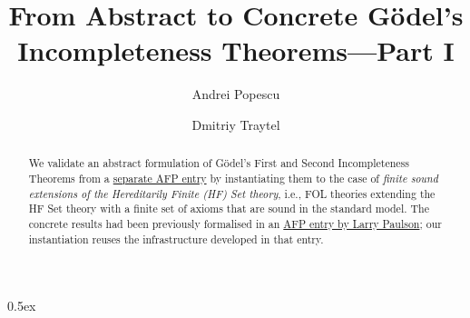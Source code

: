 \documentclass[10pt,a4paper]{article}
\begin{document}
\title{From Abstract to Concrete G\"odel's Incompleteness Theorems---Part I}
\author{Andrei Popescu \and Dmitriy Traytel}

\maketitle

\begin{abstract} We validate an abstract formulation of G\"odel's First and Second Incompleteness Theorems
from a \href{https://www.isa-afp.org/entries/Goedel_Incompleteness.html}{separate AFP entry} by instantiating
them to the case of \emph{finite sound extensions of the Hereditarily Finite (HF) Set theory}, i.e., FOL
theories extending the HF Set theory with a finite set of axioms that are sound in the standard model. The
concrete results had been previously formalised in an
\href{https://www.isa-afp.org/entries/Incompleteness.html}{AFP entry by Larry Paulson}; our instantiation
reuses the infrastructure developed in that entry.
\end{abstract}

\tableofcontents

\parindent 0pt\parskip 0.5ex


\end{document}
